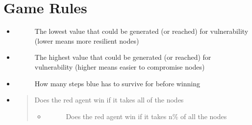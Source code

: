 \documentclass[letterpaper,10pt,english]{sphinxmanual}
\begin{document}
\section{Game Rules}
\label{\detokenize{source/config_file:game-rules}}\begin{itemize}
\item {} \begin{description}
\item[{}] \leavevmode
\sphinxAtStartPar
The lowest value that could be generated (or reached) for vulnerability (lower means more resilient nodes)

\end{description}

\item {} \begin{description}
\item[{}] \leavevmode
\sphinxAtStartPar
The highest value that could be generated (or reached) for vulnerability (higher means easier to compromise nodes)

\end{description}

\item {} \begin{description}
\item[{}] \leavevmode
\sphinxAtStartPar
How many steps blue has to survive for before winning

\end{description}

\item {}
\sphinxAtStartPar
{}
\begin{quote}

\sphinxAtStartPar
Does the red agent win if it takes all of the nodes
\begin{itemize}
\item {} \begin{description}
\item[{}] \leavevmode
\sphinxAtStartPar
Does the red agent win if it takes n\% of all the nodes

\end{description}

\end{itemize}
\end{quote}


\end{itemize}
\end{document}
